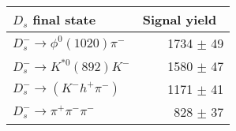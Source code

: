  \begin{tabular}{l r }
\hline\hline
$D_s$ final state  & Signal yield\ \\
\hline
$D_{s}^{-} \to \phi^{0}(1020)\pi^{-}$ & 1734 $\pm$ 49 \\
$D_{s}^{-}\to K^{*0}(892)K^{-}$ & 1580 $\pm$ 47 \\
$D_{s}^{-}\to (K^{-}h^{+}\pi^{-})$ & 1171 $\pm$ 41 \\
$D_{s}^{-}\to \pi^{+}\pi^{-}\pi^{-}$ & 828 $\pm$ 37 \\
\hline\hline
\end{tabular}
\label{table:signalYieldsDs}
